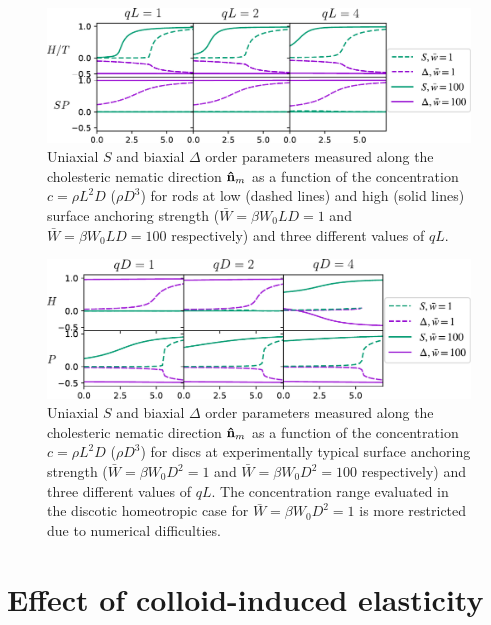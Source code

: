    \begin{figure}
	\includegraphics[width = \columnwidth]{figures/chapter-4/ordervsc_rods}
	\caption{ Uniaxial $S$ and biaxial $\Delta$ order parameters measured along the cholesteric nematic direction ${\bf \hat{n}}_{m}$ as a function of the concentration $c = \rho L^{2}D$ ($\rho D^{3}$) for rods at low (dashed lines) and high (solid lines) surface anchoring strength ($\bar{W} = \beta W_{0}LD = 1$ and $\bar{W} = \beta W_{0}LD = 100$ respectively) and three different values of $qL$.}
	\label{w1o}
\end{figure}

   \begin{figure}
	\includegraphics[width = \columnwidth]{figures/chapter-4/ordervsc_discs}
	\caption{ Uniaxial $S$ and biaxial $\Delta$ order parameters measured along the cholesteric nematic direction ${\bf \hat{n}}_{m}$ as a function of the concentration $c = \rho L^{2}D$ ($\rho D^{3}$) for discs at experimentally typical surface anchoring strength ($\bar{W} = \beta W_{0}D^2 = 1$ and $\bar{W} = \beta W_{0}D^2 = 100$ respectively) and three different values of $qL$.  The concentration range evaluated in the discotic homeotropic case for $\bar{W} = \beta W_{0}D^2 = 1$ is more restricted due to  numerical difficulties.}
	\label{w100o}
\end{figure}




\section{Effect of colloid-induced elasticity}

